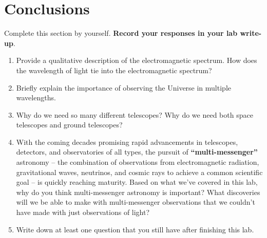 \documentclass[11pt]{article}
\begin{document}
\section{Conclusions}

Complete this section by yourself. \textbf{Record your responses in your lab write-up}.
\begin{enumerate}
    \item Provide a qualitative description of the electromagnetic spectrum. How does the wavelength of light tie into the electromagnetic spectrum?
    
    \item Briefly explain the importance of observing the Universe in multiple wavelengths. 
    
    \item Why do we need so many different telescopes? Why do we need both space telescopes and ground telescopes?
    
    \item With the coming decades promising rapid advancements in telescopes, detectors, and observatories of all types, the pursuit of \textbf{``multi-messenger''} astronomy -- the combination of observations from electromagnetic radiation, gravitational waves, neutrinos, and cosmic rays to achieve a common scientific goal -- is quickly reaching maturity. Based on what we've covered in this lab, why do you think multi-messenger astronomy is important? What discoveries will we be able to make with multi-messenger observations that we couldn't have made with just observations of light?  
    
    \item Write down at least one question that you still have after finishing this lab.
    
\end{enumerate}
\end{document}
